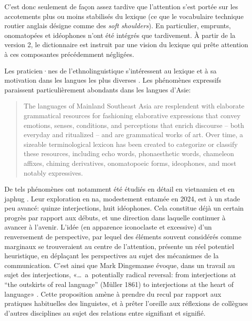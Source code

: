 C'est donc seulement de façon assez tardive que l'attention s'est portée sur les accotements plus ou moins stabilisés du lexique (ce que le vocabulaire technique routier anglais désigne comme des \emph{soft shoulders}). En particulier, emprunts, onomatopées et idéophones n'ont été intégrés que tardivement. À partir de la version 2, le dictionnaire est instruit par une vision du lexique qui prête attention à ces composantes précédemment négligées.

Les praticien·nes de l'ethnolinguistique s'intéressent au lexique et à sa motivation dans les langues les plus diverses \parencite{deColombel2002lexique}. Les phénomènes expressifs paraissent particulièrement abondants dans les langues d'Asie:

\begin{quotation}
    The languages of Mainland Southeast Asia are resplendent with elaborate grammatical resources for fashioning elaborative expressions that convey emotions, senses, conditions, and perceptions that enrich discourse -- both everyday and ritualized -- and are grammatical works of art. Over time, a sizeable terminological lexicon has been created to categorize or classify these resources, including echo words, phonaesthetic words, chameleon affixes, chiming derivatives, onomatopoeic forms, ideophones, and most notably expressives. \parencite[1]{williams_aesthetics_2014}
\end{quotation}

De tels phénomènes ont notamment été étudiés en détail en vietnamien \parencite{brunelleetal2014} et en japhug \parencite{jacques2013c}. Leur exploration en na, modestement entamée en 2024, est à un stade peu avancé: quinze interjections, huit idéophones. Cela constitue déjà un certain progrès par rapport aux débuts, et une direction dans laquelle continuer à avancer à l'avenir. L'idée (en apparence iconoclaste et excessive) d'un renversement de perspective, par lequel des éléments souvent considérés comme marginaux se trouveraient au centre de l'attention, présente un réel potentiel heuristique, en déplaçant les perspectives au sujet des mécanismes de la communication. C'est ainsi que Mark Dingemanse évoque, dans un travail au sujet des interjections, «{\dots}~a~potentially
radical reversal: from interjections at “the outskirts of real language” (Müller 1861) to interjections at the heart of language» \parencite[258]{dingemanse_interjections_2024}. Cette proposition amène à prendre du recul par rapport aux pratiques habituelles des linguistes, et à prêter l'oreille aux réflexions de collègues d'autres disciplines au sujet des relations entre signifiant et signifié.

